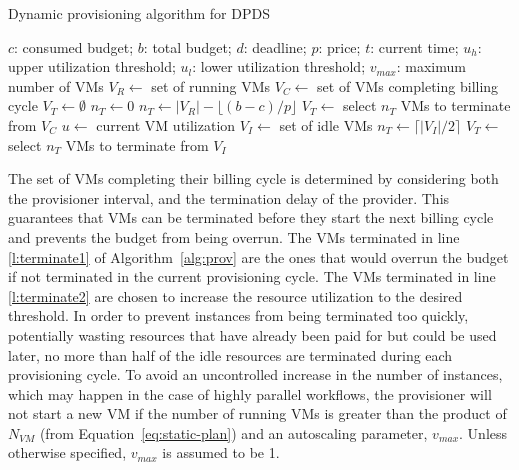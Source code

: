 \documentclass[conference]{IEEEtran}
\begin{document}
\begin{algorithm}[tb]
\caption{Dynamic provisioning algorithm for DPDS}
\label{alg:prov}
{\small
\begin{algorithmic}[1]
\Require $c$: consumed budget; $b$: total budget; $d$: deadline; $p$: price;
$t$: current time; $u_h$: upper utilization threshold; $u_l$: lower utilization
threshold; $v_{max}$: maximum number of VMs
  \State $V_R\gets$ set of running VMs
    \State $V_C\gets$ set of VMs completing billing cycle
    \State $V_T\gets \emptyset$ 
    \State $n_T\gets 0$ 
      \State $n_T\gets |V_R| - \lfloor(b-c)/p\rfloor$
      \State $V_T\gets$ select $n_T$ VMs to terminate from $V_C$
      \State {} \label{l:terminate1}
    \Else 
    \State $u\gets$ current VM utilization
        \State {}
        \State $V_I\gets$ set of idle VMs
        \State $n_T\gets \lceil|V_I|/2\rceil$ \label{l:nT2}
      \State $V_T\gets$ select $n_T$ VMs to terminate from $V_I$
        \State {} \label{l:terminate2}
      \EndIf 
    \EndIf
\EndProcedure
\end{algorithmic}
}
\end{algorithm}

The set of VMs completing their billing cycle is determined by considering both the provisioner interval, and the termination delay of the provider. This guarantees that VMs can be terminated before they start the next billing cycle and prevents the budget from being overrun. The VMs terminated in line \ref{l:terminate1} of Algorithm~\ref{alg:prov} are the ones that would overrun the budget if not terminated in the current provisioning cycle. The VMs terminated in line \ref{l:terminate2} are chosen to increase the resource utilization to the desired threshold. In order to prevent instances from being terminated too quickly, potentially wasting resources that have already been paid for but could be used later, no more than half of the idle resources are terminated during each provisioning cycle. To avoid an uncontrolled increase in the number of instances, which may happen in the case of highly parallel workflows, the provisioner will not start a new VM if the number of running VMs is greater than the product of $N_{VM}$ (from Equation~\ref{eq:static-plan}) and an autoscaling parameter, $v_{max}$. Unless otherwise specified, $v_{max}$ is assumed to be 1.
\end{document}
